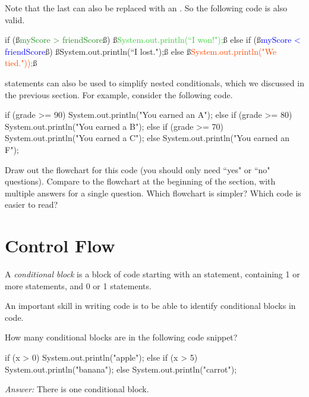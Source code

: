 \begin{example}
Note that the last  can also be replaced with an . So the following code is also valid.

\begin{code}
if (ß\textcolor{ForestGreen}{myScore > friendScore}ß) 
{
    ß\textcolor{LimeGreen}{System.out.println(``I won!");}ß
}
else if (ß\textcolor{Blue}{myScore < friendScore}ß)
{
    ß\textcolor{Cerulean}{System.out.println(``I lost.");}ß
}
else
{
    ß\textcolor{OrangeRed}{System.out.println("We tied."));}ß
}
\end{code}

\end{example}

\begin{exercise}
 statements can also be used to simplify nested conditionals, which we discussed in the previous section. For example, consider the following code.

\begin{code}
if (grade >= 90) {
    System.out.println("You earned an A");
} else {
    if (grade >= 80) {
        System.out.println("You earned a B");
    } else {
        if (grade >= 70) {
            System.out.println("You earned a C");
        } else {
            System.out.println("You earned an F");
        }
    }
}
\end{code}

Draw out the flowchart for this code (you should only need ``yes" or ``no" questions). Compare to the flowchart at the beginning of the section, with multiple answers for a single question. Which flowchart is simpler? Which code is easier to read?
\end{exercise}

\section{Control Flow}

\begin{definition}
A \emph{conditional block} is a block of code starting with an  statement, containing 1 or more  statements, and 0 or 1  statements.
\end{definition}

An important skill in writing code is to be able to identify conditional blocks in code.

\begin{example}
How many conditional blocks are in the following code snippet?

\begin{code}
if (x > 0) 
{
    System.out.println("apple");
} 
else if (x > 5) 
{
    System.out.println("banana");
} 
else 
{
    System.out.println("carrot");
} 
\end{code}

\textit{Answer: } There is one conditional block.

\end{example}


